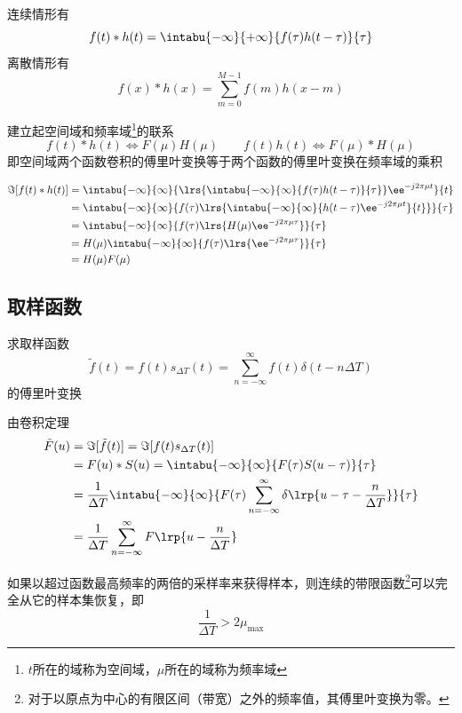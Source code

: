 \begin{definition}[卷积]
连续情形有
\[f(t)*h(t)=\intabu{-\infty}{+\infty}{f(\tau)h(t-\tau)}{\tau}\]
离散情形有
\[f(x)*h(x)=\sum_{m=0}^{M-1}f(m)h(x-m)\]
\end{definition}
\begin{theorem}[卷积定理]
建立起空间域和频率域\footnote{$t$所在的域称为空间域，$\mu$所在的域称为频率域}的联系
\[f(t)*h(t)\iff F(\mu)H(\mu)
\qquad
f(t)h(t)\iff F(\mu)*H(\mu)\]
即空间域两个函数卷积的傅里叶变换等于两个函数的傅里叶变换在频率域的乘积
\end{theorem}
\begin{analysis}
\[\begin{aligned}
\Im[f(t)*h(t)]&=\intabu{-\infty}{\infty}{\lrs{\intabu{-\infty}{\infty}{f(\tau)h(t-\tau)}{\tau}}\ee^{-j2\pi\mu t}}{t}\\
&=\intabu{-\infty}{\infty}{f(\tau)\lrs{\intabu{-\infty}{\infty}{h(t-\tau)\ee^{-j2\pi\mu t}}{t}}}{\tau}\\
&=\intabu{-\infty}{\infty}{f(\tau)\lrs{H(\mu)\ee^{-j2\pi\mu\tau}}}{\tau}\\
&=H(\mu)\intabu{-\infty}{\infty}{f(\tau)\lrs{\ee^{-j2\pi\mu\tau}}}{\tau}\\
&=H(\mu)F(\mu)
\end{aligned}\]
\end{analysis}

\subsection{取样函数}
\begin{example}
求取样函数
\[\tilde{f}(t)=f(t)s_{\Delta T}(t)=\sum_{n=-\infty}^{\infty}f(t)\delta(t-n\Delta T)\]
的傅里叶变换
\end{example}
\begin{analysis}
由卷积定理
\[\begin{aligned}
\tilde{F}(u)&=\Im[\tilde{f}(t)]=\Im[f(t)s_{\Delta T}(t)]\\
&=F(u)*S(u)=\intabu{-\infty}{\infty}{F(\tau)S(u-\tau)}{\tau}\\
&=\frac{1}{\Delta T}\intabu{-\infty}{\infty}{F(\tau)\sum_{n=-\infty}^{\infty}\delta\lrp{u-\tau-\frac{n}{\Delta T}}}{\tau}\\
&=\frac{1}{\Delta T}\sum_{n=-\infty}^{\infty}F\lrp{u-\frac{n}{\Delta T}}
\end{aligned}\]
\end{analysis}

\begin{theorem}
如果以超过函数最高频率的两倍的采样率来获得样本，则连续的带限函数\footnote{对于以原点为中心的有限区间（带宽）之外的频率值，其傅里叶变换为零。
}可以完全从它的样本集恢复，即
\[\frac{1}{\Delta T}>2\mu_{\max}\]
\end{theorem}

